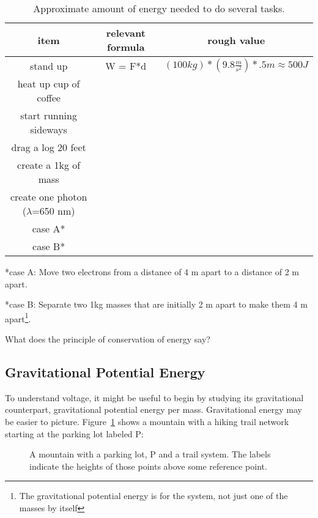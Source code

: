 \begin{table}[H]
\begin{center}
\begin{tabular}{|c| c| c|} \hline
item & relevant formula	& rough value \\ \hline
stand up	& W = F*d	& $(100kg)*(9.8 \frac{m}{s^2})*.5 m \approx 500J$\\ \hline
heat up cup of coffee &	& \\ \hline
start running sideways	&	&\\ \hline
drag a log 20 feet	&	&\\ \hline
create a 1kg of mass	&	&\\ \hline
create one photon ($\lambda$=650 nm)	&	&	\\ \hline
case A*			&	&\\ \hline
case B*			&	&\\ \hline
\end{tabular}
\caption{Approximate amount of energy needed to do several tasks.}
\end{center}
\end{table}

\noindent
*case A: Move two electrons from a distance of 4 m apart to a distance of 2 m apart.
\par
\noindent
*case B: Separate two 1kg masses that are initially 2 m apart to make them 4 m apart\footnote{The gravitational potential energy is for the system, not just one of the masses by itself}.
\linebreak

\begin{blevel}
What does the principle of conservation of energy say?
\end{blevel}

\subsection{Gravitational Potential Energy}
To understand voltage, it might be useful to begin by studying its gravitational counterpart, gravitational potential energy per mass. Gravitational energy may be easier to picture. Figure~\ref{F:2MT} shows a mountain with a hiking trail network starting at the parking lot labeled P:
\par
\begin{figure}[H]
\begin{center}
\caption{A mountain with a parking lot, P and a trail system. The labels indicate the heights of those points above some reference point.}
\label{F:2MT}
\end{center}
\end{figure}

